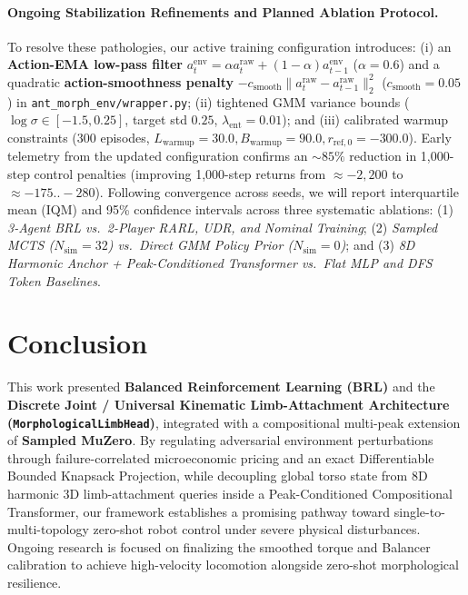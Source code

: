 \documentclass[11pt,a4paper]{article}
\begin{document}
\paragraph{Ongoing Stabilization Refinements and Planned Ablation Protocol.}
To resolve these pathologies, our active training configuration introduces: (i) an \textbf{Action-EMA low-pass filter} $a_t^{\text{env}} = \alpha a_t^{\text{raw}} + (1 - \alpha)a_{t-1}^{\text{env}}$ ($\alpha = 0.6$) and a quadratic \textbf{action-smoothness penalty} $-c_{\text{smooth}}\|a_t^{\text{raw}} - a_{t-1}^{\text{raw}}\|_2^2$ ($c_{\text{smooth}} = 0.05$) in \texttt{ant\_morph\_env/wrapper.py}; (ii) tightened GMM variance bounds ($\log \sigma \in [-1.5, 0.25]$, target std $0.25$, $\lambda_{\text{ent}} = 0.01$); and (iii) calibrated warmup constraints ($300$ episodes, $L_{\text{warmup}} = 30.0, B_{\text{warmup}} = 90.0, r_{\text{ref},0} = -300.0$). Early telemetry from the updated configuration confirms an $\sim 85\%$ reduction in 1,000-step control penalties (improving 1,000-step returns from $\approx -2,200$ to $\approx -175\text{..}-280$). Following convergence across seeds, we will report interquartile mean (IQM) and 95\% confidence intervals \cite{agarwal2021deep} across three systematic ablations: (1) \emph{3-Agent BRL vs.~2-Player RARL, UDR, and Nominal Training}; (2) \emph{Sampled MCTS ($N_{\text{sim}}=32$) vs.~Direct GMM Policy Prior ($N_{\text{sim}}=0$)}; and (3) \emph{8D Harmonic Anchor + Peak-Conditioned Transformer vs.~Flat MLP and DFS Token Baselines}.

\section{Conclusion}

This work presented \textbf{Balanced Reinforcement Learning (BRL)} and the \textbf{Discrete Joint / Universal Kinematic Limb-Attachment Architecture (\texttt{MorphologicalLimbHead})}, integrated with a compositional multi-peak extension of \textbf{Sampled MuZero}. By regulating adversarial environment perturbations through failure-correlated microeconomic pricing and an exact Differentiable Bounded Knapsack Projection, while decoupling global torso state from 8D harmonic 3D limb-attachment queries inside a Peak-Conditioned Compositional Transformer, our framework establishes a promising pathway toward single-to-multi-topology zero-shot robot control under severe physical disturbances. Ongoing research is focused on finalizing the smoothed torque and Balancer calibration to achieve high-velocity locomotion alongside zero-shot morphological resilience.
\end{document}
